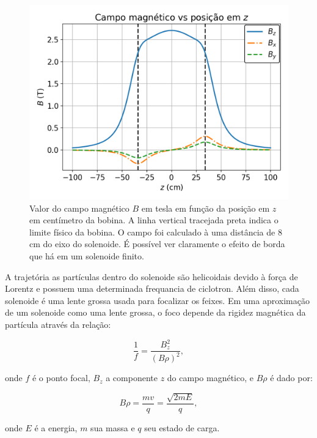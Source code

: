 \documentclass[a4paper,12pt,oneside]{book}
\begin{document}
\begin{figure}[H]
    \centering
    \includegraphics[scale = 0.85]{figs/Campo_mag.png}
    \caption{Valor do campo magnético $B$ em tesla em função da posição em $z$ em centímetro da bobina. A linha vertical tracejada preta indica o limite físico da bobina. O campo foi calculado à uma distância de 8 cm do eixo do solenoide. É possível ver claramente o efeito de borda que há em um solenoide finito\cite{magnetic_field}.}
    \label{fig:campo_mag}
\end{figure}


\par A trajetória as partículas dentro do solenoide são helicoidais devido à força de Lorentz e possuem uma determinada frequancia de ciclotron\cite{ribras_leo}. Além disso, cada solenoide é uma lente grossa usada para focalizar os feixes. Em uma aproximação de um solenoide como uma lente grossa, o foco depende da rigidez magnética da partícula através da relação\cite{KOLATA1989503, zamora_mater}:

\begin{equation}
    \frac{1}{f} = \frac{B_z ^2}{(B\rho)^2},
\end{equation}

onde $f$ é o ponto focal, $B_z$ a componente $z$ do campo magnético, e $B\rho$ é dado por:

\begin{equation}
    B\rho = \frac{mv}{q} = \frac{\sqrt{2mE}}{q},
\end{equation}

onde $E$ é a energia, $m$ sua massa e $q$ seu estado de carga.
\end{document}
